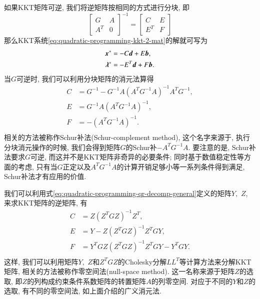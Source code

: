 如果KKT矩阵可逆, 我们将逆矩阵按相同的方式进行分块, 即
\begin{equation}
\label{eq:quadratic-programming-kkt-inverse}
\begin{bmatrix} G & A \\ A^T & 0 \end{bmatrix}^{-1} = \begin{bmatrix} C & E \\ E^T & F \end{bmatrix}
\end{equation}
那么KKT系统\eqref{eq:quadratic-programming-kkt-2-mat}的解就可写为
\begin{equation}
\label{eq:quadratic-programming-kkt-sol-1}
\begin{aligned}
{\bm{x}}^* & = - C {\bm{d}} + E {\bm{b}}, \\
{\bm{\lambda}}^* & = - E^T {\bm{d}} + F {\bm{b}}. \\
\end{aligned}
\end{equation}
当$G$可逆时, 我们可以利用分块矩阵的消元法算得
\begin{equation}
\label{eq:quadratic-programming-kkt-inv-1}
\begin{aligned}
C & = G^{-1} - G^{-1} A \left( A^TG^{-1}A \right)^{-1} A^T G^{-1},\\
E & = G^{-1} A \left( A^TG^{-1}A \right)^{-1},\\
F & = - \left( A^TG^{-1}A \right)^{-1}.\\
\end{aligned}
\end{equation}
相关的方法被称作Schur补法(Schur-complement method), 这个名字来源于, 执行分块消元操作的时候, 我们会得到矩阵$G$的Schur补$-A^TG^{-1}A.$ 要注意的是, Schur补法要求$G$可逆, 而这并不是KKT矩阵非奇异的必要条件; 同时基于数值稳定性等方面的考虑, 只有当$G$正定以及$A^TG^{-1}A$的计算开销足够小等一系列条件得到满足, Schur补法才有应用的价值.

我们可以利用式\eqref{eq:quadratic-programming-qr-decomp-general}定义的矩阵$Y,$ $Z$, 来求KKT矩阵的逆矩阵, 有
\begin{equation}
\label{eq:quadratic-programming-kkt-inv-2}
\begin{aligned}
C & = Z \left( Z^T G Z \right)^{-1} Z^T,\\
E & = Y - Z \left( Z^T G Z \right)^{-1} Z^T G Y,\\
F & = Y^T G Z \left( Z^T G Z \right)^{-1} Z^T G Y - Y^T G Y.\\
\end{aligned}
\end{equation}
这样, 我们可以利用矩阵$Y,$ $Z$和$Z^T G Z$的Cholesky分解$L L^T$等计算方法来分解KKT矩阵, 相关的方法被称作零空间法(null-space method). 这一名称来源于矩阵$Z$的选取, 即$Z$的列构成约束条件系数矩阵的转置矩阵$A$的列零空间. 对应于不同的$Y$和$Z$的选取, 有不同的零空间法, 如上面介绍的广义消元法.

